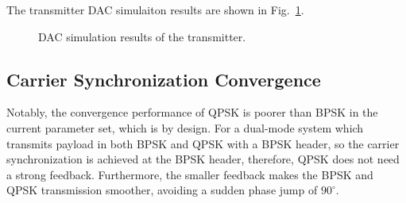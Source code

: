 \documentclass[journal,twoside]{IEEEtran}
\begin{document}
      The transmitter DAC simulaiton results are shown in Fig.~\ref{fig:tx_dac_sim}.
      \begin{figure}[h]
        \setlength{\tabcolsep}{2pt}
        \hfill%
        \caption{DAC simulation results of the transmitter.}
        \label{fig:tx_dac_sim}
      \end{figure}

    \subsection{Carrier Synchronization Convergence}\label{subsec:costas_convergence}

      Notably, the convergence performance of QPSK is poorer than BPSK in the current parameter set,
      which is by design.
      For a dual-mode system which transmits payload in both BPSK and QPSK with a BPSK header,
      so the carrier synchronization is achieved at the BPSK header,
      therefore, QPSK does not need a strong feedback.
      Furthermore, the smaller feedback makes the BPSK and QPSK transmission smoother,
      avoiding a sudden phase jump of $90^\circ$.
\end{document}
